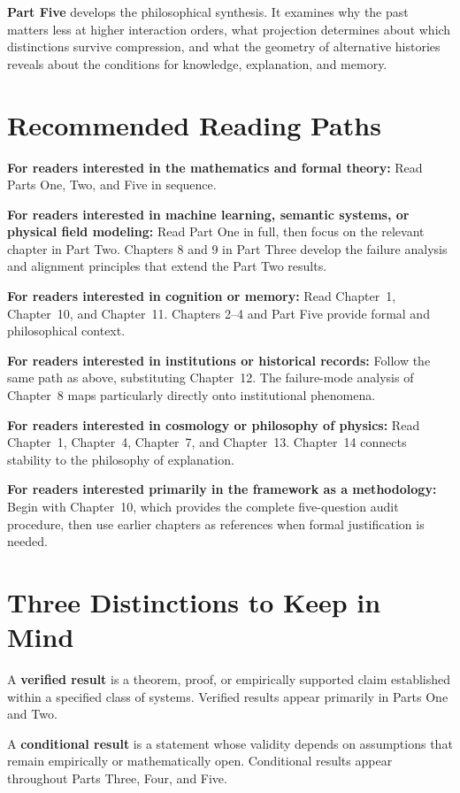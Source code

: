 \textbf{Part Five} develops the philosophical synthesis. It examines why the past matters less at higher interaction orders, what projection determines about which distinctions survive compression, and what the geometry of alternative histories reveals about the conditions for knowledge, explanation, and memory.

\section*{Recommended Reading Paths}

\textbf{For readers interested in the mathematics and formal theory:} Read Parts One, Two, and Five in sequence.

\textbf{For readers interested in machine learning, semantic systems, or physical field modeling:} Read Part One in full, then focus on the relevant chapter in Part Two. Chapters 8 and 9 in Part Three develop the failure analysis and alignment principles that extend the Part Two results.

\textbf{For readers interested in cognition or memory:} Read Chapter~1, Chapter~10, and Chapter~11. Chapters 2--4 and Part Five provide formal and philosophical context.

\textbf{For readers interested in institutions or historical records:} Follow the same path as above, substituting Chapter~12. The failure-mode analysis of Chapter~8 maps particularly directly onto institutional phenomena.

\textbf{For readers interested in cosmology or philosophy of physics:} Read Chapter~1, Chapter~4, Chapter~7, and Chapter~13. Chapter~14 connects stability to the philosophy of explanation.

\textbf{For readers interested primarily in the framework as a methodology:} Begin with Chapter~10, which provides the complete five-question audit procedure, then use earlier chapters as references when formal justification is needed.

\section*{Three Distinctions to Keep in Mind}

A \textbf{verified result} is a theorem, proof, or empirically supported claim established within a specified class of systems. Verified results appear primarily in Parts One and Two.

A \textbf{conditional result} is a statement whose validity depends on assumptions that remain empirically or mathematically open. Conditional results appear throughout Parts Three, Four, and Five.

